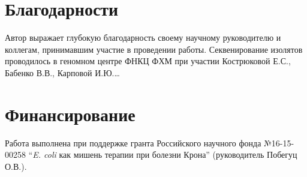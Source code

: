 \chapter{Благодарности}
Автор выражает глубокую благодарность своему научному руководителю и коллегам, принимавшим участие в проведении работы. Секвенирование изолятов  проводилось в геномном центре ФНКЦ ФХМ при участии Кострюковой Е.С., Бабенко В.В., Карповой И.Ю.\dots


\chapter{Финансирование}
Работа выполнена при поддержке гранта Российского научного фонда №16-15-00258 ``\textit{E. coli} как мишень терапии при болезни Крона'' (руководитель Побегуц О.В.).
